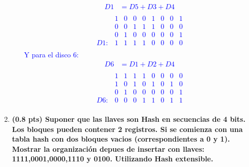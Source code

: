 \documentclass{templateNote}
\begin{document}
\begin{enumerate}
\begin{enumerate}
        \textcolor{blue}{
            \begin{align*}
                D1 &= D5 + D3 + D4 \\
            \end{align*}
            \begin{equation*}
                \begin{array}{ccccccccc}
                        & 1 & 0 & 0 & 0 & 1 & 0 & 0 & 1 \\
                        & 0 & 0 & 1 & 1 & 1 & 0 & 0 & 0 \\
                        & 0 & 1 & 0 & 0 & 0 & 0 & 0 & 1 \\ \hline
                    D1: & 1 & 1 & 1 & 1 & 0 & 0 & 0 & 0 \\
                \end{array}
            \end{equation*}
            Y para el disco 6:
            \begin{align*}
                D6 &= D1 + D2 + D4 \\
            \end{align*}
            \begin{equation*}
                \begin{array}{ccccccccc}
                        & 1 & 1 & 1 & 1 & 0 & 0 & 0 & 0 \\
                        & 1 & 0 & 1 & 0 & 1 & 0 & 1 & 0 \\
                        & 0 & 1 & 0 & 0 & 0 & 0 & 0 & 1 \\ \hline
                    D6: & 0 & 0 & 0 & 1 & 1 & 0 & 1 & 1 \\
                \end{array}
            \end{equation*}    
        }
    \end{enumerate}

    \item \textbf{(0.8 pts) Suponer que las llaves son Hash en secuencias de 4 bits. Los bloques pueden contener 2 registros. Si se comienza con una tabla hash con dos bloques vacios (correspondientes a 0 y 1). Mostrar la organización depues de insertar con llaves: 1111,0001,0000,1110 y 0100. Utilizando Hash extensible.}
    

\end{enumerate}
\end{document}
